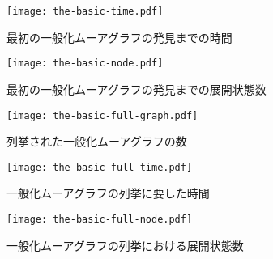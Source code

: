 \begin{figure}
  \centering
  \texttt{[image: the-basic-time.pdf]}
  \caption{最初の一般化ムーアグラフの発見までの時間}
  \label{fig:basic-time}
\end{figure}
\begin{figure}
  \centering
  \texttt{[image: the-basic-node.pdf]}
  \caption{最初の一般化ムーアグラフの発見までの展開状態数}
  \label{fig:basic-node}
\end{figure}

\begin{figure}
  \centering
  \texttt{[image: the-basic-full-graph.pdf]}
  \caption{列挙された一般化ムーアグラフの数}
  \label{fig:basic-full-graph}
\end{figure}
\begin{figure}
  \centering
  \texttt{[image: the-basic-full-time.pdf]}
  \caption{一般化ムーアグラフの列挙に要した時間}
  \label{fig:basic-full-time}
\end{figure}
\begin{figure}
  \centering
  \texttt{[image: the-basic-full-node.pdf]}
  \caption{一般化ムーアグラフの列挙における展開状態数}
  \label{fig:basic-full-node}
\end{figure}

